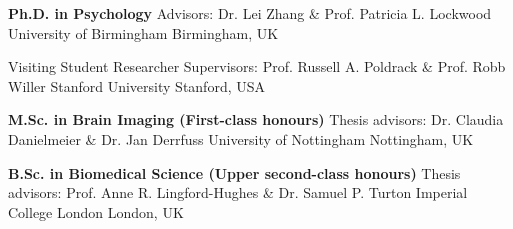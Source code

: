 	{\textbf{Ph.D. in Psychology}}
	{Advisors: Dr. Lei Zhang \& Prof. Patricia L. Lockwood}
	{University of Birmingham}
	{Birmingham, UK}

\cventry{}
	{Visiting Student Researcher}
	{Supervisors: Prof. Russell A. Poldrack \& Prof. Robb Willer}
	{Stanford University}
	{Stanford, USA}

	{\textbf{M.Sc. in Brain Imaging (First-class honours)}}
	{Thesis advisors: Dr. Claudia Danielmeier \& Dr. Jan Derrfuss}
	{University of Nottingham}
	{Nottingham, UK}

	{\textbf{B.Sc. in Biomedical Science (Upper second-class honours)}}
	{Thesis advisors: Prof. Anne R. Lingford-Hughes \& Dr. Samuel P. Turton}
	{Imperial College London}
	{London, UK}
